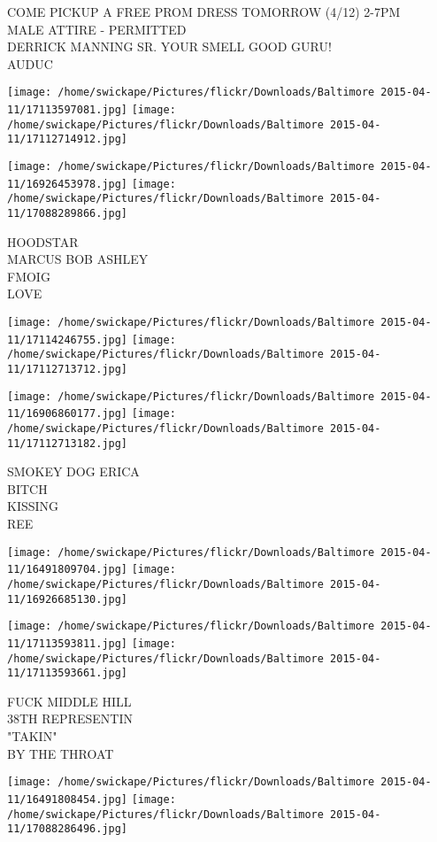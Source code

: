 \documentclass[10pt,letterpaper]{article}
\begin{document}
COME PICKUP A FREE PROM DRESS TOMORROW (4/12) 2{-}7PM\\
MALE ATTIRE {-} PERMITTED\\
DERRICK MANNING SR.  YOUR SMELL GOOD GURU!\\
AUDUC
\pagebreak

\texttt{[image: /home/swickape/Pictures/flickr/Downloads/Baltimore 2015-04-11/17113597081.jpg]}
\texttt{[image: /home/swickape/Pictures/flickr/Downloads/Baltimore 2015-04-11/17112714912.jpg]}

\texttt{[image: /home/swickape/Pictures/flickr/Downloads/Baltimore 2015-04-11/16926453978.jpg]}
\texttt{[image: /home/swickape/Pictures/flickr/Downloads/Baltimore 2015-04-11/17088289866.jpg]}

HOODSTAR\\
MARCUS BOB ASHLEY\\
FMOIG\\
LOVE
\pagebreak

\texttt{[image: /home/swickape/Pictures/flickr/Downloads/Baltimore 2015-04-11/17114246755.jpg]}
\texttt{[image: /home/swickape/Pictures/flickr/Downloads/Baltimore 2015-04-11/17112713712.jpg]}

\texttt{[image: /home/swickape/Pictures/flickr/Downloads/Baltimore 2015-04-11/16906860177.jpg]}
\texttt{[image: /home/swickape/Pictures/flickr/Downloads/Baltimore 2015-04-11/17112713182.jpg]}

SMOKEY DOG ERICA\\
BITCH\\
KISSING\\
REE
\pagebreak

\texttt{[image: /home/swickape/Pictures/flickr/Downloads/Baltimore 2015-04-11/16491809704.jpg]}
\texttt{[image: /home/swickape/Pictures/flickr/Downloads/Baltimore 2015-04-11/16926685130.jpg]}

\texttt{[image: /home/swickape/Pictures/flickr/Downloads/Baltimore 2015-04-11/17113593811.jpg]}
\texttt{[image: /home/swickape/Pictures/flickr/Downloads/Baltimore 2015-04-11/17113593661.jpg]}

FUCK MIDDLE HILL\\
38TH REPRESENTIN\\
"TAKIN"\\
BY THE THROAT
\pagebreak

\texttt{[image: /home/swickape/Pictures/flickr/Downloads/Baltimore 2015-04-11/16491808454.jpg]}
\texttt{[image: /home/swickape/Pictures/flickr/Downloads/Baltimore 2015-04-11/17088286496.jpg]}
\end{document}
